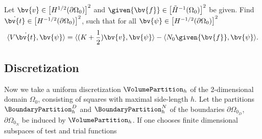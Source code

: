 Let $\bv{v}\in \left[ H^{1/2}(\partial{\Omega_0})\right] ^{2}$ and $\given{\bv{f}}\in \left[ \tilde{H}^{-1}({\Omega_0})\right] ^{2}$ be given.
\vspace{8pt}
\newline
Find  $\dot{\bv{t}}\in \left[ H^{-1/2}(\partial{\Omega_0})\right] ^{2}$, such that for all $ \bv{\psi}\in \left[ H^{-1/2}(\partial{\Omega_0})\right]^{2}$
\begin{equation}
\langle V\dot{\bv{t}},\bv{\psi}\rangle=\langle (K+\frac{1}{2})\bv{v},\bv{\psi}\rangle-\langle N_{0}\given{\bv{f}},\bv{\psi}\rangle.
\end{equation} 



\subsection{Discretization}
Now we take a uniform discretization $\VolumePartition_{h}$ of the 2-dimensional domain ${\Omega_0}$, consisting of squares with maximal side-length $h$. Let the partitions $\BoundaryPartition^{D}_{h}$ and $\BoundaryPartition^{N}_{h}$ of the boundaries $\partial{\Omega_{0_D}}$, $\partial{\Omega_{0_N}}$ be induced by $\VolumePartition_{h}$. If one chooses finite dimensional subspaces of test and trial functions 



